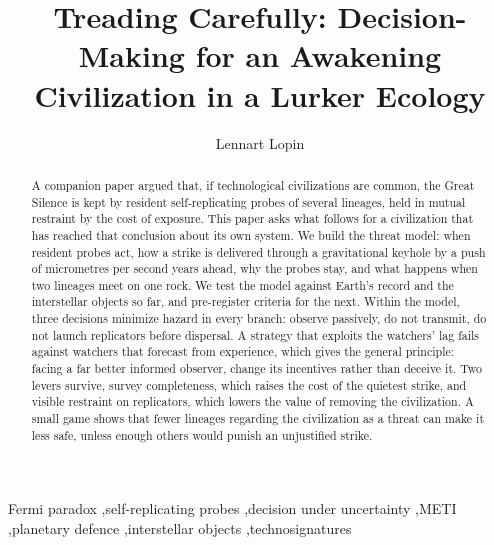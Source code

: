 \documentclass[preprint,12pt]{elsarticle}
\theoremstyle{definition}
\begin{document}
\begin{frontmatter}

\title{Treading Carefully: Decision-Making for an Awakening Civilization in a Lurker Ecology}

\author[aff1]{Lennart Lopin}

\begin{abstract}
A companion paper argued that, if technological civilizations are common, the Great Silence is kept by resident self-replicating probes of several lineages, held in mutual restraint by the cost of exposure. This paper asks what follows for a civilization that has reached that conclusion about its own system. We build the threat model: when resident probes act, how a strike is delivered through a gravitational keyhole by a push of micrometres per second years ahead, why the probes stay, and what happens when two lineages meet on one rock. We test the model against Earth's record and the interstellar objects so far, and pre-register criteria for the next. Within the model, three decisions minimize hazard in every branch: observe passively, do not transmit, do not launch replicators before dispersal. A strategy that exploits the watchers' lag fails against watchers that forecast from experience, which gives the general principle: facing a far better informed observer, change its incentives rather than deceive it. Two levers survive, survey completeness, which raises the cost of the quietest strike, and visible restraint on replicators, which lowers the value of removing the civilization. A small game shows that fewer lineages regarding the civilization as a threat can make it less safe, unless enough others would punish an unjustified strike.
\end{abstract}

\begin{keyword}
Fermi paradox \sep self-replicating probes \sep decision under uncertainty \sep METI \sep planetary defence \sep interstellar objects \sep technosignatures
\end{keyword}

\end{frontmatter}
\end{document}
